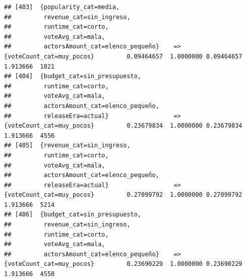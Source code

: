 \documentclass[
]{article}
\begin{document}
\begin{verbatim}
## [403]  {popularity_cat=media,                                                                                                   
##         revenue_cat=sin_ingreso,                                                                                                
##         runtime_cat=corto,                                                                                                      
##         voteAvg_cat=mala,                                                                                                       
##         actorsAmount_cat=elenco_pequeño}    => {voteCount_cat=muy_pocos}         0.09464657  1.0000000 0.09464657 1.913666  1821
## [404]  {budget_cat=sin_presupuesto,                                                                                             
##         runtime_cat=corto,                                                                                                      
##         voteAvg_cat=mala,                                                                                                       
##         actorsAmount_cat=elenco_pequeño,                                                                                        
##         releaseEra=actual}                  => {voteCount_cat=muy_pocos}         0.23679834  1.0000000 0.23679834 1.913666  4556
## [405]  {revenue_cat=sin_ingreso,                                                                                                
##         runtime_cat=corto,                                                                                                      
##         voteAvg_cat=mala,                                                                                                       
##         actorsAmount_cat=elenco_pequeño,                                                                                        
##         releaseEra=actual}                  => {voteCount_cat=muy_pocos}         0.27099792  1.0000000 0.27099792 1.913666  5214
## [406]  {budget_cat=sin_presupuesto,                                                                                             
##         revenue_cat=sin_ingreso,                                                                                                
##         runtime_cat=corto,                                                                                                      
##         voteAvg_cat=mala,                                                                                                       
##         actorsAmount_cat=elenco_pequeño}    => {voteCount_cat=muy_pocos}         0.23690229  1.0000000 0.23690229 1.913666  4558

\end{verbatim}
\end{document}
